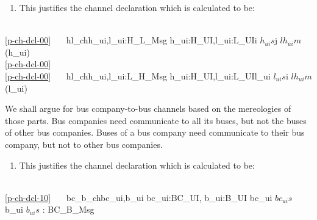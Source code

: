 \pos{\psno}{\mnewfoil}

\begin{enumerate}\setei
\item \label{p-ch-dcl-00} This justifies the channel declaration which
                        is calculated to be:
\savei\end{enumerate}\footsize\LLLL\HHHH
\bp
{}\\
\ref{p-ch-dcl-00}\ \ \ {\LBRACE} hl\_ch{\LBRACKET}h\_ui,l\_ui{\RBRACKET}:H\_L\_Msg {\BAR} h\_ui:H\_UI,l\_ui:L\_UI{\RDOT}i {\ISIN} $h_{ui}s${\WEDGE}j {\ISIN} $lh_{ui}m$(h\_ui) {\RBRACE}\\
\ref{p-ch-dcl-00}\ \ \ {\UNION}\\
\ref{p-ch-dcl-00}\ \ \ {\LBRACE} hl\_ch{\LBRACKET}h\_ui,l\_ui{\RBRACKET}:L\_H\_Msg {\BAR} h\_ui:H\_UI,l\_ui:L\_UI{\RDOT}l\_ui {\ISIN} $l_{ui}s${\WEDGE}i {\ISIN} $lh_{ui}m$(l\_ui) {\RBRACE}
\ep
\smallish
\pos{\psno}{\mnewfoil}

\noindent
\begynd
\pind We shall argue for bus company-to-bus channels
      based on the mereologies of those parts. 
\begynd
\pind Bus companies need communicate to all its buses, but not the
      buses of other bus companies.
\pind Buses of a bus company need communicate to their bus company,
      but not to other bus companies. 
\afslut
\afslut
\begin{enumerate}\setei
\item \label{p-ch-dcl-10} This justifies the channel declaration which
                        is calculated to be:
\savei\end{enumerate}\footsize\LLLL%
\bp
{}\\
\ref{p-ch-dcl-10}\ \ \ {\LBRACE} bc\_b\_ch{\LBRACKET}bc\_ui,b\_ui{\RBRACKET} {\BAR} bc\_ui:BC\_UI, b\_ui:B\_UI {\RDOT} bc\_ui {\ISIN} $bc_{ui}s$ {\WEDGE} b\_ui {\ISIN} $b_{ui}s$ {\RBRACE}: BC\_B\_Msg
\ep
\smallish
\pos{\psno}{\mnewfoil}

